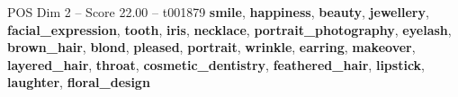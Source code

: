 \begin{textsample}{POS Dim 2 – Score 22.00 – t001879}  \label{ex:f2_pos_016}
\textbf{smile}, \textbf{happiness}, \textbf{beauty}, \textbf{jewellery}, \textbf{facial\_expression}, \textbf{tooth}, \textbf{iris}, \textbf{necklace}, \textbf{portrait\_photography}, \textbf{eyelash}, \textbf{brown\_hair}, \textbf{blond}, \textbf{pleased}, \textbf{portrait}, \textbf{wrinkle}, \textbf{earring}, \textbf{makeover}, \textbf{layered\_hair}, \textbf{throat}, \textbf{cosmetic\_dentistry}, \textbf{feathered\_hair}, \textbf{lipstick}, \textbf{laughter}, \textbf{floral\_design}

\end{textsample}
